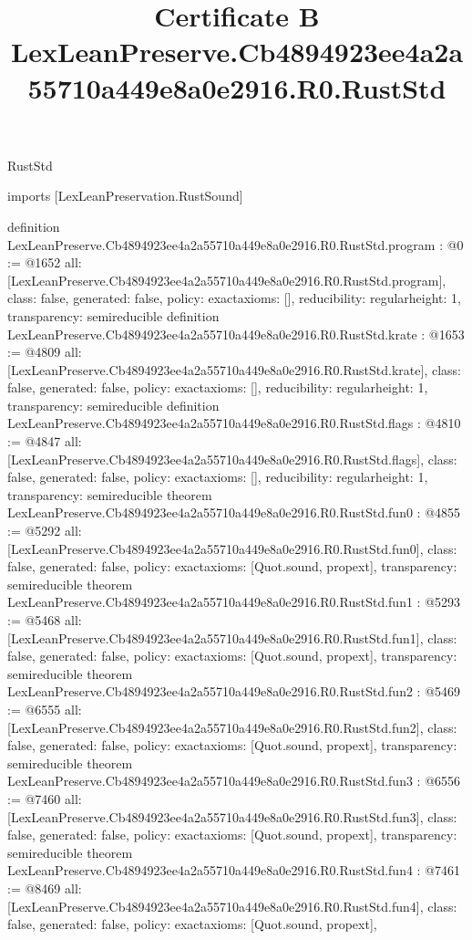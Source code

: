 \begin{lexlean}{RustStd}
\title{Certificate B LexLeanPreserve.Cb4894923ee4a2a55710a449e8a0e2916.R0.RustStd}
\begin{coremodule}
imports [LexLeanPreservation.RustSound]

definition LexLeanPreserve.Cb4894923ee4a2a55710a449e8a0e2916.R0.RustStd.program : @0 := @1652 {
  all: [LexLeanPreserve.Cb4894923ee4a2a55710a449e8a0e2916.R0.RustStd.program],
  class: false,
  generated: false,
  policy: exact{axioms: []},
  reducibility: regular{height: 1},
  transparency: semireducible
}
definition LexLeanPreserve.Cb4894923ee4a2a55710a449e8a0e2916.R0.RustStd.krate : @1653 := @4809 {
  all: [LexLeanPreserve.Cb4894923ee4a2a55710a449e8a0e2916.R0.RustStd.krate],
  class: false,
  generated: false,
  policy: exact{axioms: []},
  reducibility: regular{height: 1},
  transparency: semireducible
}
definition LexLeanPreserve.Cb4894923ee4a2a55710a449e8a0e2916.R0.RustStd.flags : @4810 := @4847 {
  all: [LexLeanPreserve.Cb4894923ee4a2a55710a449e8a0e2916.R0.RustStd.flags],
  class: false,
  generated: false,
  policy: exact{axioms: []},
  reducibility: regular{height: 1},
  transparency: semireducible
}
theorem LexLeanPreserve.Cb4894923ee4a2a55710a449e8a0e2916.R0.RustStd.fun0 : @4855 := @5292 {
  all: [LexLeanPreserve.Cb4894923ee4a2a55710a449e8a0e2916.R0.RustStd.fun0],
  class: false,
  generated: false,
  policy: exact{axioms: [Quot.sound, propext]},
  transparency: semireducible
}
theorem LexLeanPreserve.Cb4894923ee4a2a55710a449e8a0e2916.R0.RustStd.fun1 : @5293 := @5468 {
  all: [LexLeanPreserve.Cb4894923ee4a2a55710a449e8a0e2916.R0.RustStd.fun1],
  class: false,
  generated: false,
  policy: exact{axioms: [Quot.sound, propext]},
  transparency: semireducible
}
theorem LexLeanPreserve.Cb4894923ee4a2a55710a449e8a0e2916.R0.RustStd.fun2 : @5469 := @6555 {
  all: [LexLeanPreserve.Cb4894923ee4a2a55710a449e8a0e2916.R0.RustStd.fun2],
  class: false,
  generated: false,
  policy: exact{axioms: [Quot.sound, propext]},
  transparency: semireducible
}
theorem LexLeanPreserve.Cb4894923ee4a2a55710a449e8a0e2916.R0.RustStd.fun3 : @6556 := @7460 {
  all: [LexLeanPreserve.Cb4894923ee4a2a55710a449e8a0e2916.R0.RustStd.fun3],
  class: false,
  generated: false,
  policy: exact{axioms: [Quot.sound, propext]},
  transparency: semireducible
}
theorem LexLeanPreserve.Cb4894923ee4a2a55710a449e8a0e2916.R0.RustStd.fun4 : @7461 := @8469 {
  all: [LexLeanPreserve.Cb4894923ee4a2a55710a449e8a0e2916.R0.RustStd.fun4],
  class: false,
  generated: false,
  policy: exact{axioms: [Quot.sound, propext]},
}
\end{coremodule}
\end{lexlean}
